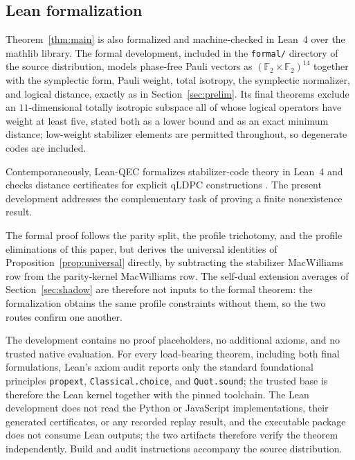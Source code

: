 \documentclass[11pt]{amsart}
\theoremstyle{definition}
\theoremstyle{remark}
\newcommand{\F}{\mathbb{F}}
\begin{document}
\subsection{Lean formalization}\label{subsec:lean}
Theorem~\ref{thm:main} is also formalized and machine-checked in Lean~4
over the mathlib library.  The formal development, included in the
\texttt{formal/} directory of the source distribution, models phase-free
Pauli vectors as $(\F_2\times\F_2)^{14}$ together with the symplectic form,
Pauli weight, total isotropy, the symplectic normalizer, and logical
distance, exactly as in Section~\ref{sec:prelim}.  Its final theorems
exclude an $11$-dimensional totally isotropic subspace all of whose logical
operators have weight at least five, stated both as a lower bound and as an
exact minimum distance; low-weight stabilizer elements are permitted
throughout, so degenerate codes are included.

Contemporaneously, Lean-QEC formalizes stabilizer-code theory in Lean~4 and
checks distance certificates for explicit qLDPC constructions
\cite{EhatammEtAlLeanQEC}.  The present development addresses the
complementary task of proving a finite nonexistence result.

The formal proof follows the parity split, the profile trichotomy, and the
profile eliminations of this paper, but derives the universal identities of
Proposition~\ref{prop:universal} directly, by subtracting the stabilizer
MacWilliams row from the parity-kernel MacWilliams row.  The self-dual
extension averages of Section~\ref{sec:shadow} are therefore not inputs to
the formal theorem: the formalization obtains the same profile constraints
without them, so the two routes confirm one another.

The development contains no proof placeholders, no additional axioms, and no
trusted native evaluation.  For every load-bearing theorem, including both
final formulations, Lean's axiom audit reports only the standard
foundational principles \texttt{propext}, \texttt{Classical.choice}, and
\texttt{Quot.sound}; the trusted base is therefore the Lean kernel together
with the pinned toolchain.  The Lean development does not read the Python or
JavaScript implementations, their generated certificates, or any recorded
replay result, and the executable package does not consume Lean outputs; the
two artifacts therefore verify the theorem independently.  Build and audit
instructions accompany the source distribution.
\end{document}
